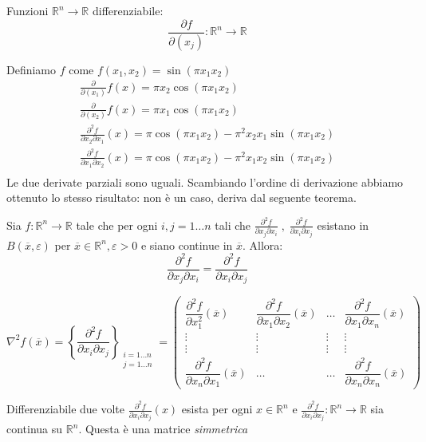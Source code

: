 Funzioni  $\mathbb{R}^{n} \rightarrow  \mathbb{R}$ differenziabile:
$$\frac{{\partial} f}{{\partial}(x_j)}: \mathbb{R}^n \rightarrow \mathbb{R}$$
\begin{example}
Definiamo $f$ come $ f(x_1,x_2) = \sin(\pi x_1 x_2)$
$$
\begin{array}{l}
\frac{{\partial}} {{\partial}(x_1)}f(x) = \pi x_2\cos(\pi x_1 x_2) \\
\frac{{\partial}} {{\partial}(x_2)}f(x) = \pi x_1\cos(\pi x_1 x_2)  \\

\frac{{\partial}^2 f} {{\partial} x_2 {\partial} x_1}(x) = \pi 
\cos(\pi x_1 x_2) - \pi^2 x_2 x_1 \sin(\pi x_1 x_2)       \\
\frac{{\partial}^2 f} {{\partial} x_1 {\partial} x_2}(x) 
= \pi \cos(\pi x_1 x_2) - \pi^2 x_1 x_2 \sin(\pi x_1 x_2) \\
\end{array}
$$
Le due derivate parziali sono uguali.
Scambiando l'ordine di derivazione abbiamo ottenuto lo stesso
risultato: non è un caso, deriva dal seguente teorema.
\end{example}
\begin{theo}
\label{th:schwarz}
 Sia $f: \mathbb{R}^n \rightarrow \mathbb{R}$ tale che per ogni $i,j = 1\ldots n$
tali che
$\frac{{\partial}^2 f}{{\partial} x_j {\partial} x_i} \; ,\; \frac{{\partial}^2 f}{{\partial} x_i {\partial} x_j}$
esistano in $B(\overline{x}, \varepsilon)$ per $\overline{x} \in \mathbb{R}^n, \varepsilon > 0$ e siano continue in $\overline{x}$.
Allora:
$$\frac{{\partial}^2 f}{{\partial} x_j {\partial} x_i} =  \frac{{\partial}^2 f}{{\partial} x_i {\partial} x_j}$$
\end{theo}
\begin{defn}
$$ \nabla^2 f(\overline{x}) = \left\{ 
 \frac{{\partial}^2 f}{{\partial} x_i {\partial} x_j}
  \right\}_{\substack{i=1 \ldots n \\j=1\ldots n}} = 
\begin{pmatrix}
\dfrac{{\partial}^2 f}{{\partial} x_1^2}(\overline{x}) & 
\dfrac{{\partial}^2 f}{{\partial} x_1 \partial x_2}(\overline{x}) & \ldots &
   \dfrac{{\partial}^2 f}{{\partial} x_1{\partial} x_n }(\overline{x}) \\
 \vdots   & \vdots  & \vdots & \vdots   \\
 \vdots   & \vdots  & \vdots  & \vdots   \\
\dfrac{{\partial}^2 f}{{\partial} x_n{\partial} x_1 }(\overline{x})
 & \ldots & \ldots &  \dfrac{{\partial}^2 f}{{\partial} x_n{\partial} x_n }(\overline{x})
\end{pmatrix}
$$
\end{defn}
Differenziabile due volte
$\frac{{\partial}^2 f}{{\partial} x_i {\partial} x_j}(x)$ esista per ogni $x \in \mathbb{R}^{n}$
e 
$\frac{{\partial}^2 f}{{\partial} x_i {\partial} x_j}: \mathbb{R}^n \rightarrow \mathbb{R}  $
sia continua su $\mathbb{R}^n$.
Questa è una matrice \emph{simmetrica}

